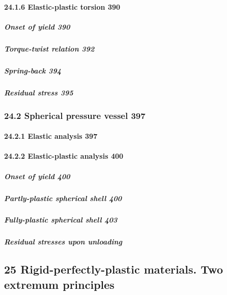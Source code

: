 \hypertarget{elastic-plastic-torsion-390}{%
\paragraph{24.1.6 Elastic-plastic torsion
390}\label{elastic-plastic-torsion-390}}

\hypertarget{onset-of-yield-390}{%
\subparagraph{Onset of yield 390}\label{onset-of-yield-390}}

\hypertarget{torque-twist-relation-392}{%
\subparagraph{Torque-twist relation
392}\label{torque-twist-relation-392}}

\hypertarget{spring-back-394}{%
\subparagraph{Spring-back 394}\label{spring-back-394}}

\hypertarget{residual-stress-395}{%
\subparagraph{Residual stress 395}\label{residual-stress-395}}

\hypertarget{spherical-pressure-vessel-397}{%
\subsubsection{24.2 Spherical pressure vessel
397}\label{spherical-pressure-vessel-397}}

\hypertarget{elastic-analysis-397}{%
\paragraph{24.2.1 Elastic analysis 397}\label{elastic-analysis-397}}

\hypertarget{elastic-plastic-analysis-400}{%
\paragraph{24.2.2 Elastic-plastic analysis
400}\label{elastic-plastic-analysis-400}}

\hypertarget{onset-of-yield-400}{%
\subparagraph{Onset of yield 400}\label{onset-of-yield-400}}

\hypertarget{partly-plastic-spherical-shell-400}{%
\subparagraph{Partly-plastic spherical shell
400}\label{partly-plastic-spherical-shell-400}}

\hypertarget{fully-plastic-spherical-shell-403}{%
\subparagraph{Fully-plastic spherical shell
403}\label{fully-plastic-spherical-shell-403}}

\hypertarget{residual-stresses-upon-unloading}{%
\subparagraph{Residual stresses upon
unloading}\label{residual-stresses-upon-unloading}}

\hypertarget{rigid-perfectly-plastic-materials.-two-extremum-principles}{%
\subsection{25 Rigid-perfectly-plastic materials. Two extremum
principles}\label{rigid-perfectly-plastic-materials.-two-extremum-principles}}

